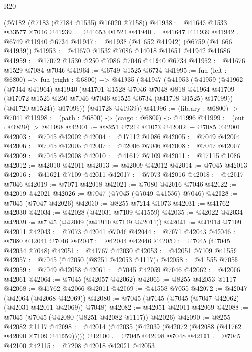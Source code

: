 \begin{lexlean}{R20}
\begin{coremodule}
{    (@7182 (@7183 (@7184 @1535) @16020 @7158))
@41938 := @41643 @1533 @33577 @7046
@41939 := @41653 @1524
@41940 := @41647 @41939
@41942 := @6749 @41940 @6734
@41947 := @41938 (@41652 @41942) (@6759 (@41666 @41939))
@41953 := @41670 @1532 @7086 @14018 @41651 @41942 @41686
@41959 := @17072 @1530 @250 @7086 @7046 @41940 @6734
@41962 := @41676 @1529 @7084 @7046
@41964 := @6749 @1525 @6734
@41995 := fun (left : @6800) =>
  fun (right : @6800) =>
  @41935
    (@41947
      (@41953
        (@41959
          (@41962
            (@7344 @41964)
            @41940
            (@41701
              @1528
              @7046
              @7048
              @818
              @41964
              @41709
              (@17072 @1526 @250 @7046 @7046 @1525 @6734 (@41708 @1525) @17099))
            (@41720 @1524))
          @17099))
      (@41728 @41939))
@41996 := (library : @6800) -> @7041
@41998 := (path : @6800) -> (cargo : @6800) -> @41996
@41999 := (out : @6829) -> @41998
@42001 := @8251 @7214 @1073
@42002 := @7085 @42001
@42003 := @7045 @42002
@42004 := @17112 @1086
@42005 := @7049 @42004
@42006 := @7045 @42005
@42007 := @42006 @7046
@42008 := @7047 @42007
@42009 := @7045 @42008
@42010 := @41617 @7109
@42011 := @17115 @1086
@42012 := @42010 @42011
@42013 := @42009 @42012
@42014 := @7045 @42013
@42016 := @41621 @7109 @42011
@42017 := @7073 @42016
@42018 := @42017 @7046
@42019 := @7071 @42018
@42021 := @7080 @42016 @7046
@42022 := @42019 @42021
@42026 := @7047 (@7045 (@7049 @41556) @7046)
@42028 := @7045 (@7047 @42026)
@42030 := @8255 @7214 @1073
@42031 := @41762 @42030
@42034 := @42028 (@42031 @7109 @41559)
@42035 := @42022 @42034
@42039 := @7045 (@42009 (@41910 @7109 @42011))
@42041 := @41914 @7109 @42011
@42043 := @7073 @42041 @7046
@42044 := @7071 @42043
@42046 := @7080 @42041 @7046
@42047 := @42044 @42046
@42050 := @7045 (@7045 @42034 @7048)
@42051 := @41767 @42030
@42053 := @42051 @7109 @41559
@42057 := @7045 (@42050 (@8251 @42053 @1117))
@42058 := @41555 @7055
@42059 := @7049 @42058
@42061 := @7045 @42059 @7046
@42062 := @42006 @42061
@42064 := @7045 (@42057 @42062)
@42066 := @8255 @42053 @1117
@42068 := @41762 @42066 @42011
@42069 := @41558 @7055
@42072 := @42047 (@42064 (@42068 @42069))
@42080 := @7045 (@7045 (@7045 (@7047 @42062) (@42031 @42011 @42069)) @7048)
@42082 := @42051 @42011 @42069
@42088 := @7045 (@7045 (@42080 (@8251 @42082 @1117)) @42026)
@42090 := @8255 @42082 @1117
@42098 := @42014 (@42035 (@42039 (@42072 (@42088 (@41762 @42090 @7109 @41559)))))
@42100 := @7045 @42098 @7048
@42101 := @7045 @42100
@42115 := @7208
    @42018
    @42021
    @42053
}
\end{coremodule}
\end{lexlean}
